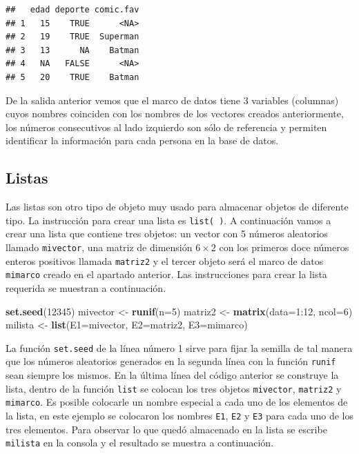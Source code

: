 \documentclass[10pt,]{krantz}
\makeatletter
\newenvironment{Shaded}{\begin{snugshade}}{\end{snugshade}}
\newcommand{\KeywordTok}[1]{\textcolor[rgb]{0.13,0.29,0.53}{\textbf{{#1}}}}
\newcommand{\DataTypeTok}[1]{\textcolor[rgb]{0.13,0.29,0.53}{{#1}}}
\newcommand{\DecValTok}[1]{\textcolor[rgb]{0.00,0.00,0.81}{{#1}}}
\newcommand{\StringTok}[1]{\textcolor[rgb]{0.31,0.60,0.02}{{#1}}}
\newcommand{\NormalTok}[1]{{#1}}
\newenvironment{kframe}{%
\medskip{}
\setlength{\fboxsep}{.8em}
 \def\at@end@of@kframe{}%
 \ifinner\ifhmode%
  \def\at@end@of@kframe{\end{minipage}}%
  \begin{minipage}{\columnwidth}%
 \fi\fi%
 \def\FrameCommand##1{\hskip\@totalleftmargin \hskip-\fboxsep
 \colorbox{shadecolor}{##1}\hskip-\fboxsep
     \hskip-\linewidth \hskip-\@totalleftmargin \hskip\columnwidth}%
 \MakeFramed {\advance\hsize-\width
   \@totalleftmargin\z@ \linewidth\hsize
   \@setminipage}}%
 {\par\unskip\endMakeFramed%
 \at@end@of@kframe}
\renewenvironment{Shaded}{\begin{kframe}}{\end{kframe}}
\makeatother
\begin{document}
\begin{verbatim}
##   edad deporte comic.fav
## 1   15    TRUE      <NA>
## 2   19    TRUE  Superman
## 3   13      NA    Batman
## 4   NA   FALSE      <NA>
## 5   20    TRUE    Batman
\end{verbatim}

De la salida anterior vemos que el marco de datos tiene 3 variables
(columnas) cuyos nombres coinciden con los nombres de los vectores
creados anteriormente, los números consecutivos al lado izquierdo son
sólo de referencia y permiten identificar la información para cada
persona en la base de datos.

\subsection{Listas}

Las listas  son otro tipo de objeto muy usado para
almacenar objetos de diferente tipo. La instrucción para crear una lista
es \texttt{list(\ )}. A continuación vamos a crear una lista que
contiene tres objetos: un vector con 5 números aleatorios llamado
\texttt{mivector}, una matriz de dimensión \(6 \times 2\) con los
primeros doce números enteros positivos llamada \texttt{matriz2} y el
tercer objeto será el marco de datos \texttt{mimarco} creado en el
apartado anterior. Las instrucciones para crear la lista requerida se
muestran a continuación.

\begin{Shaded}
\begin{Highlighting}[]
\KeywordTok{set.seed}\NormalTok{(}\DecValTok{12345}\NormalTok{)}
\NormalTok{mivector <-}\StringTok{ }\KeywordTok{runif}\NormalTok{(}\DataTypeTok{n=}\DecValTok{5}\NormalTok{)}
\NormalTok{matriz2 <-}\StringTok{ }\KeywordTok{matrix}\NormalTok{(}\DataTypeTok{data=}\DecValTok{1}\NormalTok{:}\DecValTok{12}\NormalTok{, }\DataTypeTok{ncol=}\DecValTok{6}\NormalTok{)}
\NormalTok{milista <-}\StringTok{ }\KeywordTok{list}\NormalTok{(}\DataTypeTok{E1=}\NormalTok{mivector, }\DataTypeTok{E2=}\NormalTok{matriz2, }\DataTypeTok{E3=}\NormalTok{mimarco)}
\end{Highlighting}
\end{Shaded}

La función \texttt{set.seed} de la línea número 1 sirve para fijar la
semilla de tal manera que los números aleatorios generados en la segunda
línea con la función \texttt{runif} sean siempre los mismos. En la
última línea del código anterior se construye la lista, dentro de la
función \texttt{list} se colocan los tres objetos \texttt{mivector},
\texttt{matriz2} y \texttt{mimarco}. Es posible colocarle un nombre
especial a cada uno de los elementos de la lista, en este ejemplo se
colocaron los nombres \texttt{E1}, \texttt{E2} y \texttt{E3} para cada
uno de los tres elementos. Para observar lo que quedó almacenado en la
lista se escribe \texttt{milista} en la consola y el resultado se
muestra a continuación.
\end{document}
